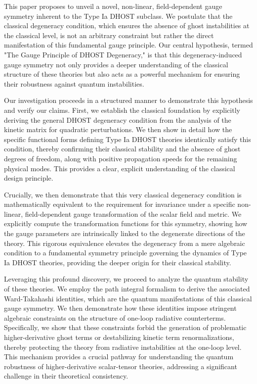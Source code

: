 \documentclass[twocolumn]{aastex631}
\begin{document}
This paper proposes to unveil a novel, non-linear, field-dependent gauge symmetry inherent to the Type Ia DHOST subclass. We postulate that the classical degeneracy condition, which ensures the absence of ghost instabilities at the classical level, is not an arbitrary constraint but rather the direct manifestation of this fundamental gauge principle. Our central hypothesis, termed "The Gauge Principle of DHOST Degeneracy," is that this degeneracy-induced gauge symmetry not only provides a deeper understanding of the classical structure of these theories but also acts as a powerful mechanism for ensuring their robustness against quantum instabilities.

Our investigation proceeds in a structured manner to demonstrate this hypothesis and verify our claims. First, we establish the classical foundation by explicitly deriving the general DHOST degeneracy condition from the analysis of the kinetic matrix for quadratic perturbations. We then show in detail how the specific functional forms defining Type Ia DHOST theories identically satisfy this condition, thereby confirming their classical stability and the absence of ghost degrees of freedom, along with positive propagation speeds for the remaining physical modes. This provides a clear, explicit understanding of the classical design principle.

Crucially, we then demonstrate that this very classical degeneracy condition is mathematically equivalent to the requirement for invariance under a specific non-linear, field-dependent gauge transformation of the scalar field and metric. We explicitly compute the transformation functions for this symmetry, showing how the gauge parameters are intrinsically linked to the degenerate directions of the theory. This rigorous equivalence elevates the degeneracy from a mere algebraic condition to a fundamental symmetry principle governing the dynamics of Type Ia DHOST theories, providing the deeper origin for their classical stability.

Leveraging this profound discovery, we proceed to analyze the quantum stability of these theories. We employ the path integral formalism to derive the associated Ward-Takahashi identities, which are the quantum manifestations of this classical gauge symmetry. We then demonstrate how these identities impose stringent algebraic constraints on the structure of one-loop radiative counterterms. Specifically, we show that these constraints forbid the generation of problematic higher-derivative ghost terms or destabilizing kinetic term renormalizations, thereby protecting the theory from radiative instabilities at the one-loop level. This mechanism provides a crucial pathway for understanding the quantum robustness of higher-derivative scalar-tensor theories, addressing a significant challenge in their theoretical consistency.
\end{document}

